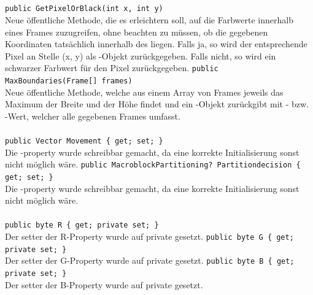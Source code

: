 \subsection{}

\paragraph{}
\begin{itemize}
	\add \verb!public GetPixelOrBlack(int x, int y)! \\
	Neue öffentliche Methode, die es erleichtern soll, auf die Farbwerte innerhalb eines Frames zuzugreifen, ohne beachten zu müssen, ob die gegebenen Koordinaten tatsächlich innerhalb des  liegen. Falls ja, so wird der entsprechende Pixel an Stelle (x, y) als -Objekt zurückgegeben. Falls nicht, so wird ein schwarzer Farbwert für den Pixel zurückgegeben.
	\add \verb!public MaxBoundaries(Frame[] frames)! \\
	Neue öffentliche Methode, welche aus einem Array von Frames jeweils das Maximum der Breite und der Höhe findet und ein -Objekt zurückgibt mit - bzw. -Wert, welcher alle gegebenen Frames umfasst.
\end{itemize}

\paragraph{}
\begin{itemize}
	\change \verb!public Vector Movement { get; set; }! \\
	Die -property wurde schreibbar gemacht, da eine korrekte Initialisierung sonst nicht möglich wäre.
	\change \verb!public MacroblockPartitioning? Partitiondecision { get; set; }! \\
	Die -property wurde schreibbar gemacht, da eine korrekte Initialisierung sonst nicht möglich wäre.
\end{itemize}

\paragraph{}
\begin{itemize}
	\change \verb!public byte R { get; private set; }! \\
	Der setter der R-Property wurde auf private gesetzt.
	\change \verb!public byte G { get; private set; }! \\
	Der setter der G-Property wurde auf private gesetzt.
	\change \verb!public byte B { get; private set; }! \\
	Der setter der B-Property wurde auf private gesetzt.
\end{itemize}

